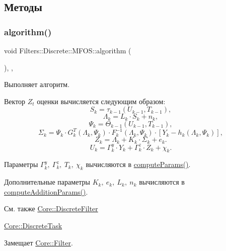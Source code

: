 \subsection{Методы}
\hypertarget{class_filters_1_1_discrete_1_1_m_f_o_s_a88e35ad4500d57e81be035959ab9bb5c}{}\label{class_filters_1_1_discrete_1_1_m_f_o_s_a88e35ad4500d57e81be035959ab9bb5c} 
\subsubsection{\texorpdfstring{algorithm()}{algorithm()}}
{\footnotesize\ttfamily void Filters\+::\+Discrete\+::\+M\+F\+O\+S\+::algorithm (\begin{DoxyParamCaption}{ }\end{DoxyParamCaption})\hspace{0.3cm}{\ttfamily [override]}, {\ttfamily [protected]}, {\ttfamily [virtual]}}



Выполняет алгоритм. 

Вектор $Z_t$ оценки вычисляется следующим образом\+: \[S_{k} = \tau_{k-1}(U_{k-1}, T_{k-1}),\] \[\Lambda_k = L_{k} \cdot S_{k} + n_{k},\] \[\Psi_k = \Theta_{k-1}(U_{k-1}, T_{k-1}),\] \[\Sigma_k = \Psi_k \cdot G_k^T(\Lambda_k, \Psi_k) \cdot F_k^{-1}(\Lambda_k, \Psi_k) \cdot [Y_k - h_k(\Lambda_k, \Psi_k)],\] \[Z_k = \Lambda_k + K_k \cdot \Sigma_k + e_k.\] \[U_k = \Gamma_k^y \cdot Y_k + \Gamma_k^z \cdot Z_k + \chi_k.\]

Параметры $\Gamma_k^y,\ \Gamma_k^z,\ T_k,\ \chi_k$ вычисляются в \hyperlink{class_filters_1_1_discrete_1_1_m_f_o_s_afb92a54a0aa1a7ecdcf527095849d123}{compute\+Params()}.

Дополнительные параметры $K_k,\ e_k,\ L_{k},\ n_{k}$ вычисляются в \hyperlink{class_filters_1_1_discrete_1_1_m_f_o_s_a0d4feb8bdd7bc3ec30a31df3ca4e13d6}{compute\+Addition\+Params()}.

\begin{DoxySeeAlso}{См. также}
\hyperlink{class_core_1_1_discrete_filter}{Core\+::\+Discrete\+Filter} 

\hyperlink{class_core_1_1_discrete_task}{Core\+::\+Discrete\+Task} 
\end{DoxySeeAlso}


Замещает \hyperlink{class_core_1_1_filter_a438681ee3e54aba2148042d9f8011ab8}{Core\+::\+Filter}.



